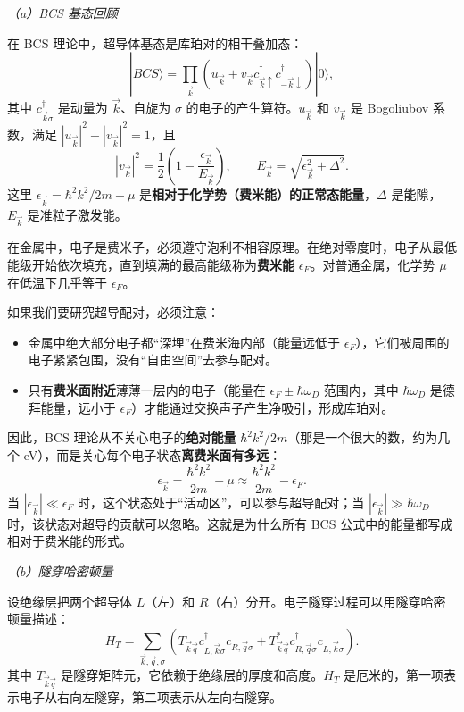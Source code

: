 \textit{（a）BCS 基态回顾}

在 BCS 理论中，超导体基态是库珀对的相干叠加态：
\[
|BCS\rangle = \prod_{\vec{k}} \left( u_{\vec{k}} + v_{\vec{k}} c_{\vec{k}\uparrow}^\dagger c_{-\vec{k}\downarrow}^\dagger \right) |0\rangle,
\]
其中 $c_{\vec{k}\sigma}^\dagger$ 是动量为 $\vec{k}$、自旋为 $\sigma$ 的电子的产生算符。$u_{\vec{k}}$ 和 $v_{\vec{k}}$ 是 Bogoliubov 系数，满足 $|u_{\vec{k}}|^2 + |v_{\vec{k}}|^2 = 1$，且
\[
|v_{\vec{k}}|^2 = \frac{1}{2}\left( 1 - \frac{\epsilon_{\vec{k}}}{E_{\vec{k}}} \right), \qquad
E_{\vec{k}} = \sqrt{\epsilon_{\vec{k}}^2 + \Delta^2}.
\]
这里 $\epsilon_{\vec{k}} = \hbar^2k^2/2m - \mu$ 是\textbf{相对于化学势（费米能）的正常态能量}，$\Delta$ 是能隙，$E_{\vec{k}}$ 是准粒子激发能。

\begin{tipbox}
在金属中，电子是费米子，必须遵守泡利不相容原理。在绝对零度时，电子从最低能级开始依次填充，直到填满的最高能级称为\textbf{费米能} $\epsilon_F$。对普通金属，化学势 $\mu$ 在低温下几乎等于 $\epsilon_F$。

如果我们要研究超导配对，必须注意：
\begin{itemize}[nosep]
    \item 金属中绝大部分电子都``深埋''在费米海内部（能量远低于 $\epsilon_F$），它们被周围的电子紧紧包围，没有``自由空间''去参与配对。
    \item 只有\textbf{费米面附近}薄薄一层内的电子（能量在 $\epsilon_F \pm \hbar\omega_D$ 范围内，其中 $\hbar\omega_D$ 是德拜能量，远小于 $\epsilon_F$）才能通过交换声子产生净吸引，形成库珀对。
\end{itemize}
因此，BCS 理论从不关心电子的\textbf{绝对能量} $\hbar^2k^2/2m$（那是一个很大的数，约为几个 eV），而是关心每个电子状态\textbf{离费米面有多远}：
\[
\epsilon_{\vec{k}} = \frac{\hbar^2k^2}{2m} - \mu \approx \frac{\hbar^2k^2}{2m} - \epsilon_F.
\]
当 $|\epsilon_{\vec{k}}| \ll \epsilon_F$ 时，这个状态处于``活动区''，可以参与超导配对；当 $|\epsilon_{\vec{k}}| \gg \hbar\omega_D$ 时，该状态对超导的贡献可以忽略。这就是为什么所有 BCS 公式中的能量都写成相对于费米能的形式。
\end{tipbox}

\textit{（b）隧穿哈密顿量}

设绝缘层把两个超导体 $L$（左）和 $R$（右）分开。电子隧穿过程可以用隧穿哈密顿量描述：
\[
H_T = \sum_{\vec{k},\vec{q},\sigma} \left( T_{\vec{k}\vec{q}} c_{L,\vec{k}\sigma}^\dagger c_{R,\vec{q}\sigma} + T_{\vec{k}\vec{q}}^* c_{R,\vec{q}\sigma}^\dagger c_{L,\vec{k}\sigma} \right).
\]
其中 $T_{\vec{k}\vec{q}}$ 是隧穿矩阵元，它依赖于绝缘层的厚度和高度。$H_T$ 是厄米的，第一项表示电子从右向左隧穿，第二项表示从左向右隧穿。


